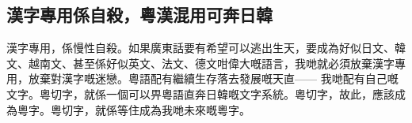 \documentclass[a5paper, 10pt, openany]{book} %
\begin{document}
\subsection*{漢字專用係自殺，粵漢混用可奔日韓}
漢字專用，係慢性自殺。如果廣東話要有希望可以逃出生天，要成為好似日文、韓文、越南文、甚至係好似英文、法文、德文咁偉大嘅語言，我哋就必須放棄漢字專用，放棄對漢字嘅迷戀。粵語配有繼續生存落去發展嘅天直—— 我哋配有自己嘅文字。粵切字，就係一個可以畀粵語直奔日韓嘅文字系統。粵切字，故此，應該成為粵字。粵切字，就係等住成為我哋未來嘅粵字。


\end{document}
